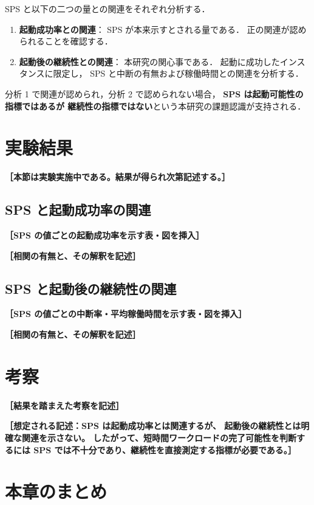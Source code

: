 \documentclass[11pt,a4paper]{ltjsreport}
\newcommand{\TBD}[1]{\textbf{［#1］}}
\begin{document}
SPS と以下の二つの量との関連をそれぞれ分析する．

\begin{enumerate}
  \item \textbf{起動成功率との関連}：
        SPS が本来示すとされる量である．
        正の関連が認められることを確認する．
  \item \textbf{起動後の継続性との関連}：
        本研究の関心事である．
        起動に成功したインスタンスに限定し，
        SPS と中断の有無および稼働時間との関連を分析する．
\end{enumerate}

分析 1 で関連が認められ，分析 2 で認められない場合，
\textbf{SPS は起動可能性の指標ではあるが
継続性の指標ではない}という本研究の課題認識が支持される．

\section{実験結果}
\label{sec:prelim_result}

\TBD{本節は実験実施中である。結果が得られ次第記述する。}

\subsection{SPS と起動成功率の関連}

\TBD{SPS の値ごとの起動成功率を示す表・図を挿入}

\TBD{相関の有無と、その解釈を記述}

\subsection{SPS と起動後の継続性の関連}

\TBD{SPS の値ごとの中断率・平均稼働時間を示す表・図を挿入}

\TBD{相関の有無と、その解釈を記述}

\section{考察}

\TBD{結果を踏まえた考察を記述}

\TBD{想定される記述：SPS は起動成功率とは関連するが、
起動後の継続性とは明確な関連を示さない。
したがって、短時間ワークロードの完了可能性を判断するには
SPS では不十分であり、継続性を直接測定する指標が必要である。}

\section{本章のまとめ}
\end{document}
